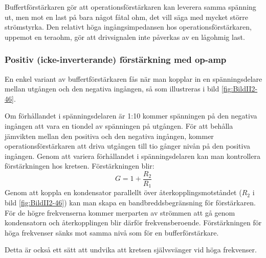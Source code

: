 Buffertförstärkaren gör att operationsförstärkaren kan leverera samma spänning
ut, men mot en last på bara något fåtal ohm, det vill säga med mycket större
strömstyrka.
Den relativt höga ingångsimpedansen hos operationsförstärkaren, uppemot en
teraohm, gör att drivsignalen inte påverkas av en lågohmig last.

\subsubsection{Positiv (icke-inverterande) förstärkning med op-amp}
\label{icke-inverterande förstärkning}

En enkel variant av buffertförstärkaren fås när man kopplar in en
spänningsdelare mellan utgången och den negativa ingången, så som illustreras i
bild \ref{fig:BildII2-46}.


Om förhållandet i spänningsdelaren är 1:10 kommer spänningen på den negativa
ingången att vara en tiondel av spänningen på utgången.
För att behålla jämvikten mellan den positiva och den negativa ingången, kommer
operationsförstärkaren att driva utgången till tio gånger nivån på den positiva
ingången.
Genom att variera förhållandet i spänningsdelaren kan man kontrollera
förstärkningen hos kretsen.
Förstärkningen blir:
\[G = 1+ \dfrac{R_2}{R_1}\]
Genom att koppla en kondensator parallellt över återkopplingsmotståndet
(\(R_2\) i bild \ref{fig:BildII2-46}) kan man skapa en bandbreddsbegränsning
för förstärkaren.
För de högre frekvenserna kommer merparten av strömmen att gå genom
kondensatorn och återkopplingen blir därför frekvensberoende.
Förstärkningen för höga frekvenser sänks mot samma nivå som för en
bufferförstärkare.

Detta är också ett sätt att undvika att kretsen självsvänger vid höga
frekvenser.

